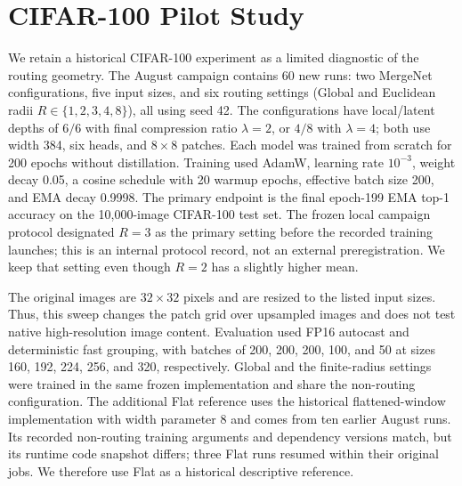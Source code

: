 \section{CIFAR-100 Pilot Study}
\label{app:cifar-spatial}

We retain a historical CIFAR-100 experiment as a limited diagnostic of the routing geometry.
The August campaign contains 60 new runs: two MergeNet configurations, five input sizes, and six routing settings (Global and Euclidean radii $R\in\{1,2,3,4,8\}$), all using seed 42.
The configurations have local/latent depths of $6/6$ with final compression ratio $\lambda=2$, or $4/8$ with $\lambda=4$; both use width 384, six heads, and $8\times8$ patches.
Each model was trained from scratch for 200 epochs without distillation.
Training used AdamW, learning rate $10^{-3}$, weight decay 0.05, a cosine schedule with 20 warmup epochs, effective batch size 200, and EMA decay 0.9998.
The primary endpoint is the final epoch-199 EMA top-1 accuracy on the 10,000-image CIFAR-100 test set.
The frozen local campaign protocol designated $R=3$ as the primary setting before the recorded training launches; this is an internal protocol record, not an external preregistration.
We keep that setting even though $R=2$ has a slightly higher mean.

The original images are $32\times32$ pixels and are resized to the listed input sizes.
Thus, this sweep changes the patch grid over upsampled images and does not test native high-resolution image content.
Evaluation used FP16 autocast and deterministic fast grouping, with batches of 200, 200, 200, 100, and 50 at sizes 160, 192, 224, 256, and 320, respectively.
Global and the finite-radius settings were trained in the same frozen implementation and share the non-routing configuration.
The additional Flat reference uses the historical flattened-window implementation with width parameter 8 and comes from ten earlier August runs.
Its recorded non-routing training arguments and dependency versions match, but its runtime code snapshot differs; three Flat runs resumed within their original jobs.
We therefore use Flat as a historical descriptive reference.

